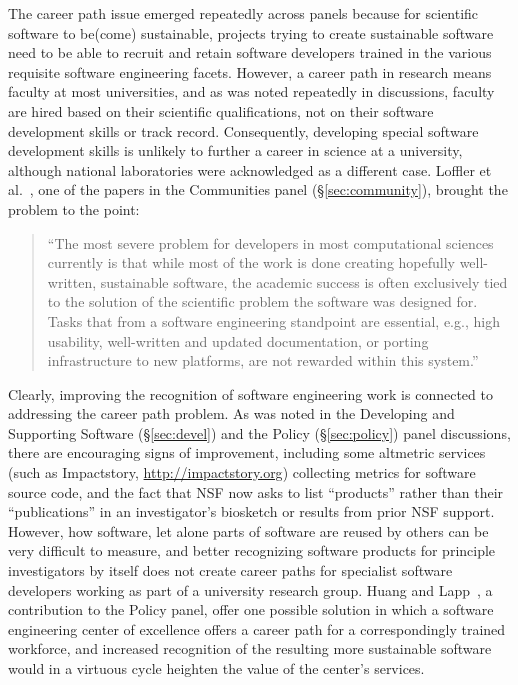 \documentclass[11pt, oneside]{amsart}
\begin{document}
The career path issue emerged repeatedly across panels because for
scientific software to be(come) sustainable, projects trying to create
sustainable software need to be able to recruit and retain software
developers trained in the various requisite software engineering
facets.  However, a career path in research means faculty at most
universities, and as was noted repeatedly in discussions, faculty
are hired based on their scientific qualifications, not on their
software development skills or track record. Consequently, developing
special software development skills is unlikely to further a career in
science at a university, although national laboratories were
acknowledged as a different case. Loffler et
al.~\cite{Loffler_WSSSPE}, one of the papers in the Communities panel
(\S\ref{sec:community}), brought the problem to the point:
\begin{quote}
  ``The most severe problem for developers in most computational
  sciences currently is that while most of the work is done creating
  hopefully well-written, sustainable software, the academic success
  is often exclusively tied to the solution of the scientific problem
  the software was designed for. Tasks that from a software
  engineering standpoint are essential, e.g., high usability,
  well-written and updated documentation, or porting infrastructure to
  new platforms, are not rewarded within this system.'' ~\cite{Loffler_WSSSPE}
\end{quote}

Clearly, improving the recognition of software engineering work is
connected to addressing the career path problem. As was noted in the
Developing and Supporting Software (\S\ref{sec:devel}) and the Policy
(\S\ref{sec:policy}) panel discussions, there are encouraging signs of
improvement, including some altmetric services (such as Impactstory,
\url{http://impactstory.org}) collecting metrics for software source
code, and the fact that NSF now asks to list ``products'' rather than
their ``publications'' in an investigator's biosketch or results from
prior NSF support. However, how software, let alone parts of software
are reused by others can be very difficult to measure, and better
recognizing software products for principle investigators by itself
does not create career paths for specialist software developers
working as part of a university research group. Huang and
Lapp~\cite{Huang_WSSSPE}, a contribution to the Policy panel, offer
one possible solution in which a software engineering center of
excellence offers a career path for a correspondingly trained
workforce, and increased recognition of the resulting more sustainable
software would in a virtuous cycle heighten the value of the center's
services.
\end{document}
